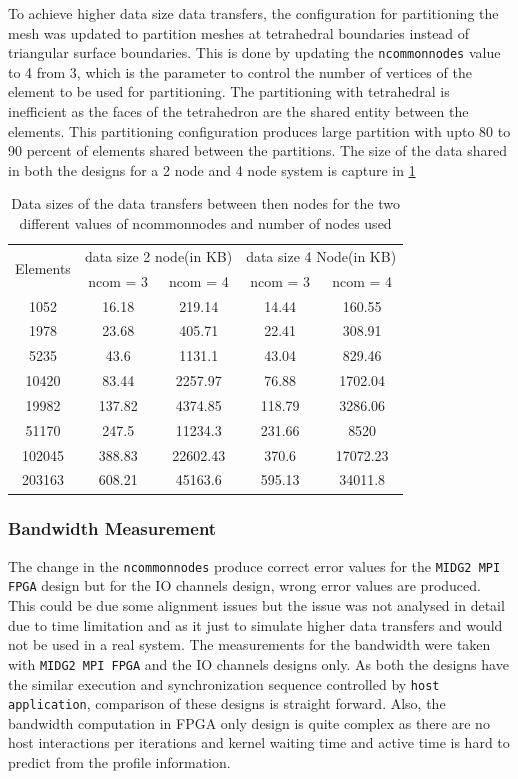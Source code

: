 To achieve higher data size data transfers, the configuration for partitioning the mesh
was updated to partition meshes at tetrahedral boundaries instead of triangular surface boundaries.
This is done by updating the \texttt{ncommonnodes} value to 4 from 3, which is the parameter
to control the number of vertices of the element to be used for partitioning. The partitioning
with tetrahedral is inefficient as the faces of the tetrahedron are the shared
entity between the elements. This partitioning configuration produces large partition
with upto 80 to 90 percent of elements shared between the partitions. The
size of the data shared in both the designs for a 2 node and 4 node system is
capture in \ref{tab:sizes_var}
\begin{table}[ht]
    \centering
    \caption{Data sizes of the data transfers between then nodes for the two different values of ncommonnodes and number of nodes used}
    \label{tab:sizes_var}
    \begin{tabular}{|ccccc|}
    \hline
    \multirow{2}{*}{Elements} & \multicolumn{2}{c|}{data size 2 node(in KB)} & \multicolumn{2}{c|}{data size 4 Node(in KB)} \\ \cline{2-5}
     & ncom = 3 & ncom = 4 & ncom = 3 & ncom = 4 \\ \hline
    1052 & 16.18 & 219.14 & 14.44 & 160.55 \\ \hline
    1978 & 23.68 & 405.71 & 22.41 & 308.91 \\ \hline
    5235 & 43.6 & 1131.1 & 43.04 & 829.46 \\ \hline
    10420 & 83.44 & 2257.97 & 76.88 & 1702.04 \\ \hline
    19982 & 137.82 & 4374.85 & 118.79 & 3286.06 \\ \hline
    51170 & 247.5 & 11234.3 & 231.66 & 8520 \\ \hline
    102045 & 388.83 & 22602.43 & 370.6 & 17072.23 \\ \hline
    203163 & 608.21 & 45163.6 & 595.13 & 34011.8 \\ \hline
    \end{tabular}%
\end{table}

\subsubsection{Bandwidth Measurement}
The change in the \texttt{ncommonnodes} produce correct error values for the \texttt{MIDG2 MPI FPGA} design but
for the IO channels design, wrong error values are produced. This could be due some alignment
issues but the issue was not analysed in detail due to time limitation and as it just to simulate
higher data transfers and would not be used in a real system. The measurements for the bandwidth
were taken with \texttt{MIDG2 MPI FPGA} and the IO channels designs only. As both the designs
have the similar execution and synchronization sequence controlled by \texttt{host application}, comparison of these designs
is straight forward. Also, the bandwidth computation in FPGA only design
is quite complex as there are no host interactions per iterations and kernel waiting time
and active time is hard to predict from the profile information.

